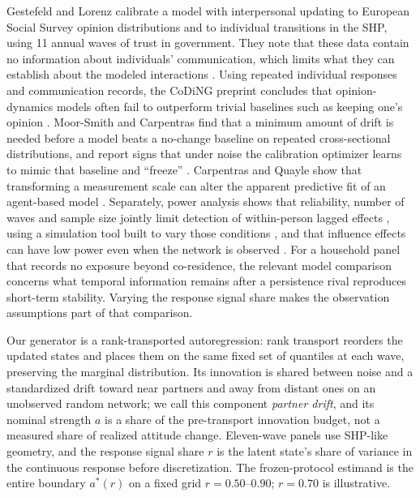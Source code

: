 Gestefeld and Lorenz calibrate a model with interpersonal updating to European Social Survey opinion distributions and to individual transitions in the SHP, using 11 annual waves of trust in government. They note that these data contain no information about individuals' communication, which limits what they can establish about the modeled interactions \cite{gestefeld2023}.
Using repeated individual responses and communication records, the CoDiNG preprint concludes that opinion-dynamics models often fail to outperform trivial baselines such as keeping one's opinion \cite{coding2024}.
Moor-Smith and Carpentras find that a minimum amount of drift is needed before a model beats a no-change baseline on repeated cross-sectional distributions, and report signs that under noise the calibration optimizer learns to mimic that baseline and ``freeze'' \cite{moor2026}.
Carpentras and Quayle show that transforming a measurement scale can alter the apparent predictive fit of an agent-based model \cite{carpentras2023}.
Separately, power analysis shows that reliability, number of waves and sample size jointly limit detection of within-person lagged effects \cite{dang2026}, using a simulation tool built to vary those conditions \cite{mulder2023}, and that influence effects can have low power even when the network is observed \cite{stadtfeld2020}.
For a household panel that records no exposure beyond co-residence, the relevant model comparison concerns what temporal information remains after a persistence rival reproduces short-term stability. Varying the response signal share makes the observation assumptions part of that comparison.

Our generator is a rank-transported autoregression: rank transport reorders the updated states and places them on the same fixed set of quantiles at each wave, preserving the marginal distribution. Its innovation is shared between noise and a standardized drift toward near partners and away from distant ones on an unobserved random network; we call this component \emph{partner drift}, and its nominal strength $a$ is a share of the pre-transport innovation budget, not a measured share of realized attitude change. Eleven-wave panels use SHP-like geometry, and the response signal share $r$ is the latent state's share of variance in the continuous response before discretization. The frozen-protocol estimand is the entire boundary $a^{*}(r)$ on a fixed grid $r=0.50$--$0.90$; $r=0.70$ is illustrative.


